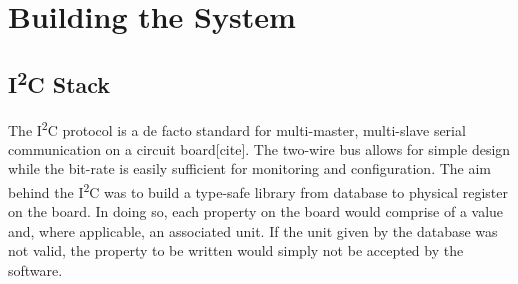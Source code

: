 \documentclass[a4paper,11pt,twocolumn]{article}
\begin{document}
	\section{Building the System}
	\subsection{I\textsuperscript{2}C Stack}
	The I\textsuperscript{2}C protocol is a de facto standard for multi-master, multi-slave serial communication on a circuit board[cite]. The two-wire bus allows for simple design while the bit-rate is easily sufficient for monitoring and configuration. The aim behind the I\textsuperscript{2}C was to build a type-safe library from database to physical register on the board. In doing so, each property on the board would comprise of a value and, where applicable, an associated unit. If the unit given by the database was not valid, the property to be written would simply not be accepted by the software.
\end{document}
